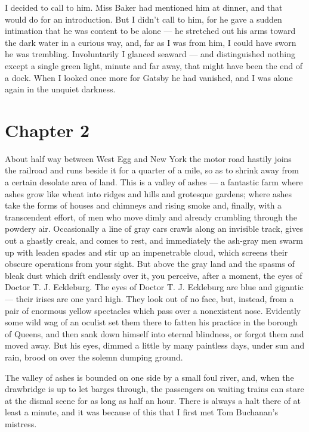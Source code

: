 \documentclass{znotebook}
\begin{document}
I decided to call to him. Miss Baker had mentioned him at dinner, and that would do for an introduction. But I didn’t call to him, for he gave a sudden intimation that he was content to be alone — he stretched out his arms toward the dark water in a curious way, and, far as I was from him, I could have sworn he was trembling. Involuntarily I glanced seaward — and distinguished nothing except a single green light, minute and far away, that might have been the end of a dock. When I looked once more for Gatsby he had vanished, and I was alone again in the unquiet darkness.

\chapter{Chapter 2}

About half way between West Egg and New York the motor road hastily joins the railroad and runs beside it for a quarter of a mile, so as to shrink away from a certain desolate area of land. This is a valley of ashes — a fantastic farm where ashes grow like wheat into ridges and hills and grotesque gardens; where ashes take the forms of houses and chimneys and rising smoke and, finally, with a transcendent effort, of men who move dimly and already crumbling through the powdery air. Occasionally a line of gray cars crawls along an invisible track, gives out a ghastly creak, and comes to rest, and immediately the ash-gray men swarm up with leaden spades and stir up an impenetrable cloud, which screens their obscure operations from your sight. But above the gray land and the spasms of bleak dust which drift endlessly over it, you perceive, after a moment, the eyes of Doctor T. J. Eckleburg. The eyes of Doctor T. J. Eckleburg are blue and gigantic — their irises are one yard high. They look out of no face, but, instead, from a pair of enormous yellow spectacles which pass over a nonexistent nose. Evidently some wild wag of an oculist set them there to fatten his practice in the borough of Queens, and then sank down himself into eternal blindness, or forgot them and moved away. But his eyes, dimmed a little by many paintless days, under sun and rain, brood on over the solemn dumping ground.

The valley of ashes is bounded on one side by a small foul river, and, when the drawbridge is up to let barges through, the passengers on waiting trains can stare at the dismal scene for as long as half an hour. There is always a halt there of at least a minute, and it was because of this that I first met Tom Buchanan’s mistress.
\end{document}
